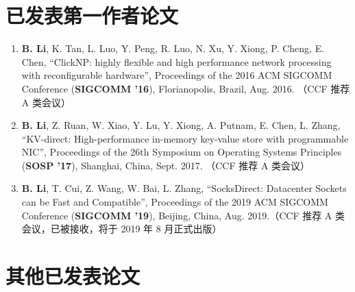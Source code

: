 
\begin{publications}

\section*{已发表第一作者论文}

\begin{enumerate}
\item \textbf{B. Li}, K. Tan, L. Luo, Y. Peng, R. Luo, N. Xu, Y. Xiong, P. Cheng, E. Chen, ``ClickNP: highly flexible and high performance network processing with reconfigurable hardware'', Proceedings of the 2016 ACM SIGCOMM Conference (\textbf{SIGCOMM '16}), Florianopolis, Brazil, Aug. 2016. （CCF 推荐 A 类会议）
\item \textbf{B. Li}, Z. Ruan, W. Xiao, Y. Lu, Y. Xiong, A. Putnam, E. Chen, L. Zhang, ``KV-direct: High-performance in-memory key-value store with programmable NIC'', Proceedings of the 26th Symposium on Operating Systems Principles (\textbf{SOSP '17}), Shanghai, China, Sept. 2017. （CCF 推荐 A 类会议）
\item \textbf{B. Li}, T. Cui, Z. Wang, W. Bai, L. Zhang, ``SocksDirect: Datacenter Sockets can be Fast and Compatible'', Proceedings of the 2019 ACM SIGCOMM Conference (\textbf{SIGCOMM '19}), Beijing, China, Aug. 2019.（CCF 推荐 A 类会议，已被接收，将于 2019 年 8 月正式出版）
\end{enumerate}

\section*{其他已发表论文}


\end{publications}

